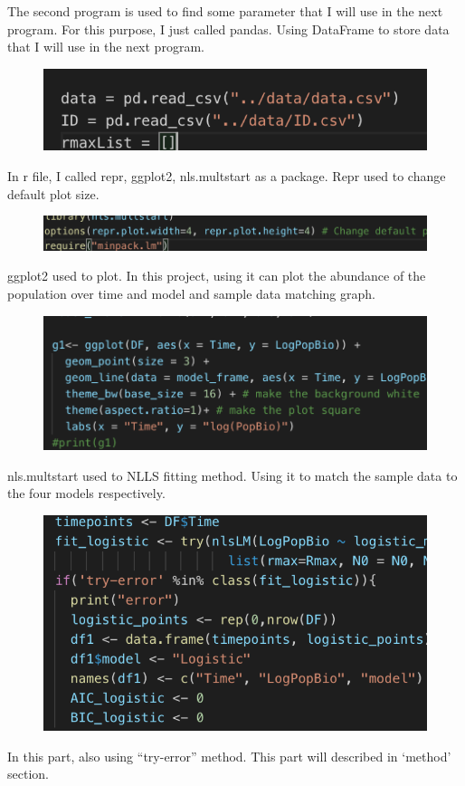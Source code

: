 \documentclass[11pt,a4 paper,title page]{article}
\begin{document}
\hfill\break
The second program is used to find some parameter that I will use in the next program. For this purpose, I just called pandas. Using DataFrame to store data that I will use in the next program.
\begin{figure}[H]
\centering
\includegraphics[width=.8\textwidth]{../picture/figure10.png}
\end{figure}
\hfill\break
In r file, I called repr, ggplot2, nls.multstart as a package. Repr used to change default plot size.
\begin{figure}[H]
\centering
\includegraphics[width=.8\textwidth]{../picture/figure11.png}
\end{figure}
\hfill\break
ggplot2 used to plot. In this project, using it can plot the abundance of the population over time and model and sample data matching graph.
\begin{figure}[H]
\centering
\includegraphics[width=.8\textwidth]{../picture/figure12.png}
\end{figure}
\hfill\break
nls.multstart used to NLLS fitting method. Using it to match the sample data to the four models respectively.
\begin{figure}[H]
\centering
\includegraphics[width=.8\textwidth]{../picture/figure13.png}
\end{figure}
\hfill\break    
In this part, also using “try-error” method. This part will described in ‘method’ section.
\end{document}
